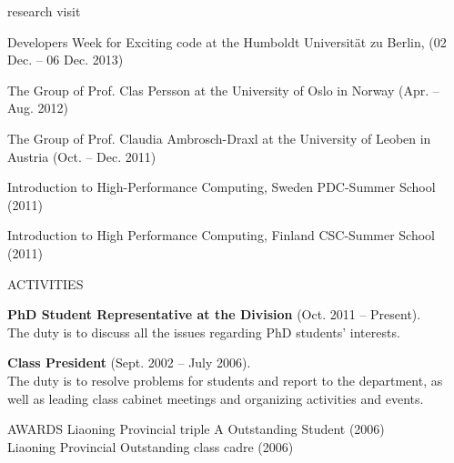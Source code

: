 \documentclass{resume} %
\begin{document}

\begin{rSection}{research visit}
 
Developers Week for Exciting code at the Humboldt Universität zu Berlin, (02 Dec. -- 06 Dec. 2013) 

The Group of  Prof. Clas Persson at the University of Oslo in Norway (Apr. -- Aug. 2012)

The Group of Prof. Claudia Ambrosch-Draxl at the University of Leoben in Austria (Oct. -- Dec. 2011)

Introduction to High-Performance Computing, Sweden PDC-Summer School (2011) 

Introduction to High Performance Computing, Finland CSC-Summer School (2011)
 
\end{rSection}


\begin{rSection}{ACTIVITIES}


{\bf PhD Student Representative at the Division} (Oct. 2011 -- Present).\\
The duty is to discuss all the issues regarding PhD students' interests.


{\bf Class President} (Sept. 2002 -- July 2006).\\
The duty is to resolve problems for students and report to the department, as well as leading class cabinet meetings and organizing activities and events.
                            
\end{rSection}

\begin{rSection}{AWARDS}
Liaoning Provincial triple A Outstanding Student (2006)\\
Liaoning Provincial Outstanding class cadre (2006)
\end{rSection}






\newpage

 
\end{document}
